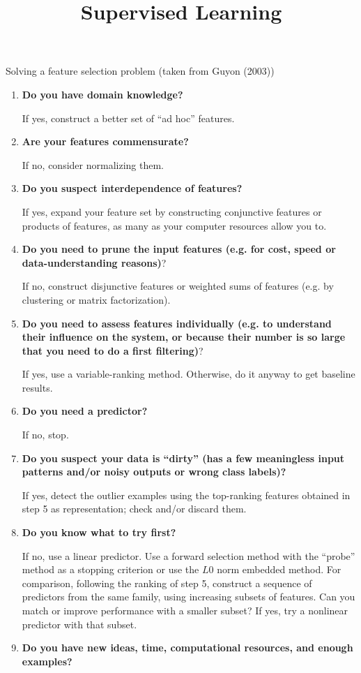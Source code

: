 \documentclass[11pt,compress,t,notes=noshow, xcolor=table]{beamer}
\title{Supervised Learning}
\date{}
\begin{document}


  \begin{vbframe}{Solving a feature selection problem (taken from Guyon (2003))}

    \begin{enumerate}
      \item {\bf Do you have domain knowledge?}

        If yes, construct a better set of \enquote{ad hoc} features.
      \item {\bf Are your features commensurate?}

        If no, consider normalizing them.
      \item {\bf Do you suspect interdependence of features?}

      If yes, expand your feature set by constructing conjunctive features or products of features, as many as your computer resources allow you to.
      \item {\bf Do you need to prune the input features (e.g. for cost, speed or data-understanding reasons)}?

      If no, construct disjunctive features or weighted sums of features (e.g. by clustering or matrix factorization).
      \item {\bf Do you need to assess features individually (e.g. to understand their influence on the system, or because their number is so large that you need to do a first filtering)}?

      If yes, use a variable-ranking method.
      Otherwise, do it anyway to get baseline results.
      \item {\bf Do you need a predictor?}

      If no, stop.
      \item {\bf Do you suspect your data is \enquote{dirty} (has a few meaningless input patterns and/or noisy outputs or wrong class labels)?}

      If yes, detect the outlier examples using the top-ranking features obtained in step 5 as representation; check and/or discard them.
      \item {\bf Do you know what to try first?}

      If no, use a linear predictor.
      Use a forward selection method with the \enquote{probe} method as a stopping criterion or use the $L0$ norm embedded method.
      For comparison, following the ranking of step 5, construct a sequence of predictors from the same family, using increasing subsets of features.
      Can you match or improve performance with a smaller subset?
      If yes, try a nonlinear predictor with that subset.
      \item {\bf Do you have new ideas, time, computational resources, and enough examples?}


\end{enumerate}
\end{vbframe}
\end{document}
